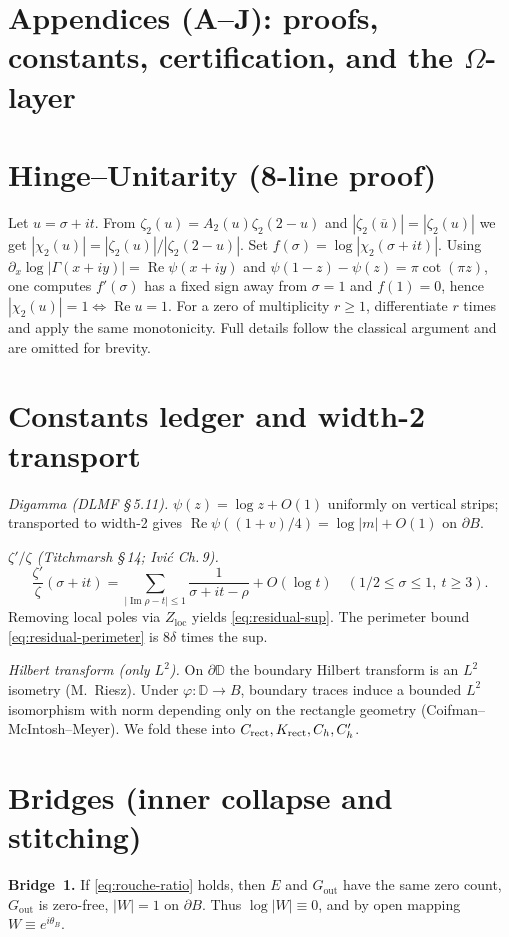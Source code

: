 \documentclass[11pt]{article}
\numberwithin{equation}{section}
\theoremstyle{remark}
\newcommand{\D}{\mathbb{D}}
\DeclareMathOperator{\Imag}{Im}
\DeclareMathOperator{\Real}{Re}
\newcommand{\Gout}{G_{\mathrm{out}}}
\newcommand{\Zloc}{Z_{\mathrm{loc}}}
\begin{document}
\appendix

\section*{Appendices (A--J): proofs, constants, certification, and the $\Omega$-layer}

\section{Hinge--Unitarity (8-line proof)}\label{app:hinge}
Let $u=\sigma+it$. From $\zeta_2(u)=A_2(u)\zeta_2(2-u)$ and $|\zeta_2(\overline u)|=|\zeta_2(u)|$ we get $|\chi_2(u)|=|\zeta_2(u)|/|\zeta_2(2-u)|$. Set $f(\sigma)=\log|\chi_2(\sigma+it)|$. Using $\partial_x\log|\Gamma(x+iy)|=\Real\psi(x+iy)$ and $\psi(1-z)-\psi(z)=\pi\cot(\pi z)$, one computes $f'(\sigma)$ has a fixed sign away from $\sigma=1$ and $f(1)=0$, hence $|\chi_2(u)|=1\iff \Real u=1$. For a zero of multiplicity $r\ge1$, differentiate $r$ times and apply the same monotonicity. Full details follow the classical argument and are omitted for brevity.

\section{Constants ledger and width-2 transport}\label{app:constants}
\emph{Digamma (DLMF §\,5.11).} $\psi(z)=\log z+O(1)$ uniformly on vertical strips; transported to width-2 gives $\Real\psi((1+v)/4)=\log|m|+O(1)$ on $\partial B$.
\smallskip

\noindent\emph{$\zeta'/\zeta$ (Titchmarsh §\,14; Ivi\'c Ch.\,9).}
\[
\frac{\zeta'}{\zeta}(\sigma+it)=\sum_{|\Imag\rho-t|\le 1}\frac{1}{\sigma+it-\rho}+O(\log t)\quad (1/2\le\sigma\le1,\ t\ge 3).
\]
Removing local poles via $\Zloc$ yields \eqref{eq:residual-sup}. The perimeter bound \eqref{eq:residual-perimeter} is $8\delta$ times the sup.
\smallskip

\noindent\emph{Hilbert transform (only $L^2$).} On $\partial\D$ the boundary Hilbert transform is an $L^2$ isometry (M.~Riesz). Under $\varphi:\D\to B$, boundary traces induce a bounded $L^2$ isomorphism with norm depending only on the rectangle geometry (Coifman--McIntosh--Meyer). We fold these into $C_{\rm rect},K_{\rm rect},C_h,C_h'$.

\section{Bridges (inner collapse and stitching)}\label{app:bridges}
\textbf{Bridge~1.} If \eqref{eq:rouche-ratio} holds, then $E$ and $\Gout$ have the same zero count, $\Gout$ is zero-free, $|W|=1$ on $\partial B$. Thus $\log|W|\equiv0$, and by open mapping $W\equiv e^{i\theta_B}$.
\smallskip
\end{document}
